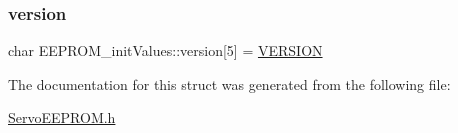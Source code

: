 \subsubsection{\texorpdfstring{version}{version}}
{\footnotesize\ttfamily char E\+E\+P\+R\+O\+M\+\_\+init\+Values\+::version\mbox{[}5\mbox{]} = \hyperlink{_general_8h_a1c6d5de492ac61ad29aec7aa9a436bbf}{V\+E\+R\+S\+I\+ON}}



The documentation for this struct was generated from the following file\+:\begin{DoxyCompactItemize}
\item 
\hyperlink{_servo_e_e_p_r_o_m_8h}{Servo\+E\+E\+P\+R\+O\+M.\+h}\end{DoxyCompactItemize}
